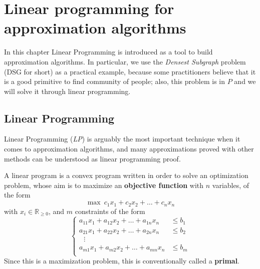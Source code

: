 \chapter[Linear programming for approximation algorithms]{Linear programming for approximation algorithms \raisebox{.3\baselineskip}{\normalsize\footnotemark}}
\label{sec:linear-programming}

In this chapter Linear Programming is introduced as a tool to build approximation algorithms. In particular, we use the \textit{Densest Subgraph} problem (DSG for short) as a practical example, because some practitioners believe that it is a good primitive to find community of people; also, this problem is in $P$ and we will solve it through linear programming.


\section[Linear Programming]{Linear Programming
\raisebox{.3\baselineskip}{\normalsize\footnotemark}}
\label{sec:linear-programming-intro}

Linear Programming (\textit{LP}) is arguably the most important technique when it comes to approximation algorithms, and many approximations proved with other methods can be understood as linear programming proof.

\begin{defn}\label{primal}
    A linear program is a convex program written in order to solve an optimization problem, whose aim is to maximize an \textbf{objective function} with $n$ variables, of the form
    \begin{equation}
    \max\ c_1 x_1 + c_2 x_2 + \ldots + c_n x_n
    \end{equation}
    with $x_i \in \mathbb{R}_{\geq 0}$, and $m$ constraints of the form
    \begin{equation}
    \begin{cases}
    a_{11} x_1 + a_{12} x_2 + \ldots + a_{1n} x_n &\leq b_1\\
    a_{21} x_1 + a_{22} x_2 + \ldots + a_{2n} x_n &\leq b_2\\
    \ \ \ \vdots\\
    a_{m1} x_1 + a_{m2} x_2 + \ldots + a_{mn} x_n &\leq b_m\\
    \end{cases}
    \end{equation}
    Since this is a maximization problem, this is conventionally called a \textbf{primal}.
\end{defn}

